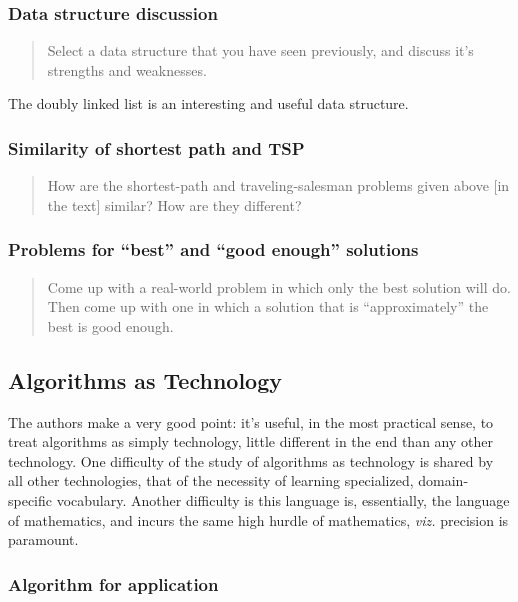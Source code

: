\documentclass{article}
\begin{document}
\subsubsection{Data structure discussion}

\begin{quote}
  Select a data structure that you have seen previously, and discuss
  it's strengths and weaknesses.
\end{quote}

The doubly linked list is an interesting and useful data structure.

\subsubsection{Similarity of shortest path and TSP}

\begin{quote}
  How are the shortest-path and traveling-salesman problems given above [in the text]
  similar? How are they different?
\end{quote}

\subsubsection{Problems for ``best'' and ``good enough'' solutions}

\begin{quote}
  Come up with a real-world problem in which only the best solution will do. Then
  come up with one in which a solution that is ``approximately'' the best is
  good enough.
\end{quote}


\subsection{Algorithms as Technology}

The authors make a very good point: it's useful, in the most
practical sense, to treat algorithms as simply technology, little
different in the end than any other technology. One difficulty
of the study of algorithms as technology is shared by all other
technologies, that of the necessity of learning specialized,
domain-specific vocabulary. Another difficulty is this language
is, essentially, the language of mathematics, and incurs the
same high hurdle of mathematics, \emph{viz.} precision is
paramount.

\subsubsection{Algorithm for application}
\end{document}
